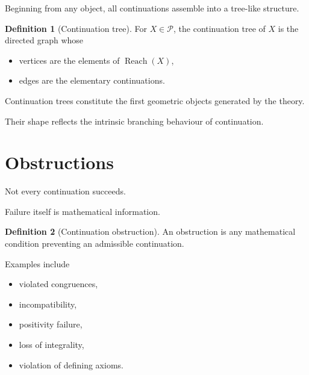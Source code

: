 \documentclass[13pt,openany]{book}
\theoremstyle{plain}
\theoremstyle{definition}
\newtheorem{definition}{Definition}[chapter]
\begin{document}
Beginning from any object, all continuations assemble into a tree-like
structure.

\begin{definition}[Continuation tree]
For \(X\in\mathcal P\), the continuation tree of \(X\) is the directed
graph whose

\begin{itemize}

\item vertices are the elements of \(\operatorname{Reach}(X)\),

\item edges are the elementary continuations.

\end{itemize}

\end{definition}

Continuation trees constitute the first geometric objects generated by the
theory.

Their shape reflects the intrinsic branching behaviour of continuation.

\section{Obstructions}

Not every continuation succeeds.

Failure itself is mathematical information.

\begin{definition}[Continuation obstruction]
An obstruction is any mathematical condition preventing an admissible
continuation.
\end{definition}

Examples include

\begin{itemize}

\item violated congruences,

\item incompatibility,

\item positivity failure,

\item loss of integrality,

\item violation of defining axioms.

\end{itemize}
\end{document}
